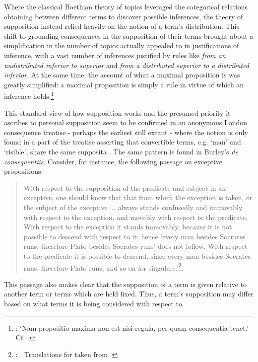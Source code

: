 \documentclass[a4paper, 11pt]{article}
\begin{document}
Where the classical Boethian theory of topics leveraged the categorical relations obtaining between different terms to discover possible inferences, the theory of supposition instead relied heavily on the notion of a term's distribution. This shift to grounding consequences in the supposition of their terms brought about a simplification in the number of topics actually appealed to in justifications of inference, with a vast number of inferences justified by rules like \emph{from an undistributed inferior to superior} and \emph{from a distributed superior to a distributed inferior}. At the same time, the account of what a maximal proposition is was greatly simplified: a maximal proposition is simply a rule in virtue of which an inference holds.\footnote{\autocite[76.5-7]{BurleyDPAL}: `Nam propositio maxima non est nisi regula, per quam consequentia tenet.' Cf. \autocite[31.3-6]{OckhamEL}.}

This standard view of how supposition works and the presumed priority it ascribes to personal supposition seem to be confirmed in an anonymous London consequence treatise - perhaps the earliest still extant - where the notion is only found in a part of the treatise asserting that convertible terms, e.g. `man' and `risible', share the same supposita \autocite[9, par. 27]{Green-Pedersen1980a}. The same pattern is found in Burley's \emph{de consequentiis}. Consider, for instance, the following passage on exceptive propositions:
\begin{quote}
With respect to the supposition of the predicate and subject in an exceptive, one should know that that from which the exception is taken, or the subject of the exceptive ... always stands confusedly and immovably with respect to the exception, and movably with respect to the predicate. With respect to the exception it stands immovably, because it is not possible to descend with respect to it; hence `every man besides Socrates runs, therefore Plato besides Socrates runs' does not follow. With respect to the predicate it is possible to descend, since every man besides Socrates runs, therefore Plato runs, and so on for singulars.'\footnote{\autocite[124, par. 58]{Green-Pedersen1980b}: . Translations for \autocite{Green-Pedersen1980a,Green-Pedersen1980b} taken from \autocite[171-273]{Archambault2017d}.}.
\end{quote}
This passage also makes clear that the supposition of a term is given relative to another term or terms which are held fixed. Thus, a term's supposition may differ based on what terms it is being considered with respect to.
\end{document}
